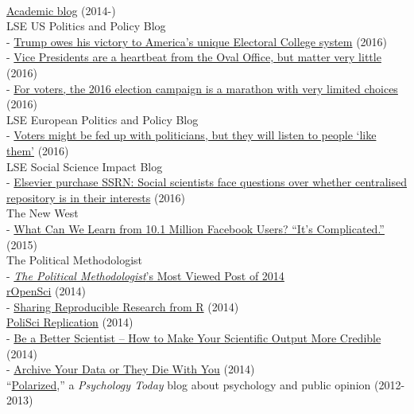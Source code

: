 \documentclass[12pt]{article}
\newcommand{\topic}[1]{\pagebreak[3]\indent {\color{lg}{\footnotesize #1 }}\\}
\newcommand{\entry}[1]{\indent {\color{lg}\guillemotright}\hspace{2pt}#1\vspace{.25em}\\}
\newcommand{\subentry}[1]{{\color{lg}-} #1\vspace{.25em}\\}
\begin{document}
	\topic{Occasional Blogging}
		\entry{\href{http://thomasleeper.com/blog}{Academic blog} (2014-)}
		\entry{LSE US Politics and Policy Blog}
			\subentry{\href{http://blogs.lse.ac.uk/usappblog/2016/11/10/trump-owes-his-victory-to-americas-unique-electoral-college-system/}{Trump owes his victory to America's unique Electoral College system} (2016)}
			\subentry{\href{http://blogs.lse.ac.uk/usappblog/2016/10/05/vice-presidents-are-a-heartbeat-from-the-oval-office-but-matter-very-little/}{Vice Presidents are a heartbeat from the Oval Office, but matter very little} (2016)}
			\subentry{\href{http://blogs.lse.ac.uk/usappblog/2016/09/23/for-voters-the-2016-election-campaign-is-a-marathon-with-very-limited-choices/}{For voters, the 2016 election campaign is a marathon with very limited choices} (2016)}
		\entry{LSE European Politics and Policy Blog}
			\subentry{\href{http://blogs.lse.ac.uk/europpblog/2016/06/23/voters-listen-people-like-them/}{Voters might be fed up with politicians, but they will listen to people `like them'} (2016)}
		\entry{LSE Social Science Impact Blog}
			\subentry{\href{http://blogs.lse.ac.uk/impactofsocialsciences/2016/05/18/elsevier-purchase-ssrn-social-scientists-face-questions-over-whether-centralised-repository-is-in-their-interests/}{Elsevier purchase SSRN: Social scientists face questions over whether centralised repository is in their interests} (2016)}
		\entry{The New West}
			\subentry{\href{https://thewpsa.wordpress.com/2015/05/09/what-can-we-learn-from-10-1-million-facebook-users-its-complicated/}{What Can We Learn from 10.1 Million Facebook Users? ``It's Complicated.''} (2015)}
		\entry{The Political Methodologist}
			\subentry{\href{http://thepoliticalmethodologist.com/2015/01/05/introducing-the-annual-tpm-most-viewed-post-award-and-our-2014-winner/}{\textit{The Political Methodologist}'s Most Viewed Post of 2014}}
		\entry{\href{http://ropensci.org/blog/}{rOpenSci} (2014)}
			\subentry{\href{https://ropensci.org/blog/2014/02/20/dvn-dataverse-network/}{Sharing Reproducible Research from R} (2014)}
		\entry{\href{http://politicalsciencereplication.wordpress.com/}{PoliSci Replication} (2014)}
			\subentry{\href{https://politicalsciencereplication.wordpress.com/2014/06/04/guest-post-be-a-better-scientist-how-to-make-your-scientific-output-more-credible-by-thomas-leeper/}{Be a Better Scientist -- How to Make Your Scientific Output More Credible} (2014)}
			\subentry{\href{https://politicalsciencereplication.wordpress.com/2014/05/21/guest-post-why-reproducibility-requires-data-archiving-by-thomas-leeper/}{Archive Your Data or They Die With You} (2014)}
		\entry{``\href{http://www.psychologytoday.com/blog/polarized}{Polarized},'' a \textit{Psychology Today} blog about psychology and public opinion (2012-2013)}
	
\end{document}
